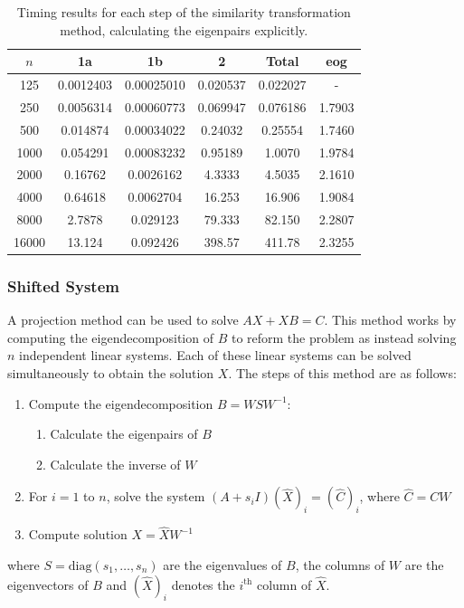 \documentclass[11pt]{article}
\numberwithin{equation}{section}
\begin{document}
\begin{table}[H]
\centering
\begin{tabular}{|c|c|c|c|c|c|}
\hline
$n$ & 1a & 1b & 2 & Total & eog \\
\hline
125 & 0.0012403 & 0.00025010 & 0.020537 & 0.022027 & - \\
250 & 0.0056314 & 0.00060773 & 0.069947 & 0.076186 & 1.7903 \\
500 & 0.014874 & 0.00034022 & 0.24032 & 0.25554 & 1.7460 \\
1000 & 0.054291 & 0.00083232 & 0.95189 & 1.0070 & 1.9784 \\
2000 & 0.16762 & 0.0026162 & 4.3333 & 4.5035 & 2.1610 \\
4000 & 0.64618 & 0.0062704 & 16.253 & 16.906 & 1.9084 \\
8000 & 2.7878 & 0.029123 & 79.333 & 82.150 & 2.2807 \\
16000 & 13.124 & 0.092426 & 398.57 & 411.78 & 2.3255 \\
\hline
\end{tabular}
\captionsetup{justification=centering}
\caption{Timing results for each step of the similarity transformation method, calculating the eigenpairs explicitly.}
\label{table:sim trans explicit steps}
\end{table}

\subsubsection{Shifted System}
A projection method \cite{Simoncini} can be used to solve $AX + XB = C$. This method works by computing the eigendecomposition of $B$ to reform the problem as instead solving $n$ independent linear systems. Each of these linear systems can be solved simultaneously to obtain the solution $X$. The steps of this method are as follows:
\begin{enumerate}
\item Compute the eigendecomposition $B = WSW^{-1}$:
	\begin{enumerate}
	\item Calculate the eigenpairs of $B$
	\item Calculate the inverse of $W$
	\end{enumerate}
\item For $i=1$ to $n$, solve the system $(A+s_i I)(\hat{X})_i = (\hat{C})_i$, where $\hat{C} = CW$
\item Compute solution $X = \hat{X}W^{-1}$
\end{enumerate}
where $S = \text{diag}(s_1, \dots, s_n)$ are the eigenvalues of $B$, the columns of $W$ are the eigenvectors of $B$ and $(\hat{X})_i$ denotes the $i^{\text{th}}$ column of $\hat{X}$.
\end{document}
